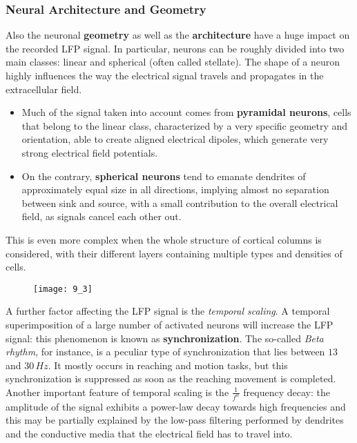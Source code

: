 \subsubsection{Neural Architecture and Geometry}
Also the neuronal \textbf{geometry} as well as the \textbf{architecture} have a huge
impact on the recorded LFP signal. In particular, neurons can be roughly divided into
two main classes: linear and spherical (often called stellate). The shape of a neuron
highly influences the way the electrical signal travels and propagates in the
extracellular field.
\begin{itemize}
    \item Much of the signal taken into account comes from \textbf{pyramidal neurons},
          cells that belong to the linear class, characterized by a very specific
          geometry and orientation, able to create aligned electrical dipoles, which
          generate very strong electrical field potentials.
    \item On the contrary, \textbf{spherical neurons} tend to emanate dendrites of
          approximately equal size in all directions, implying almost no separation
          between sink and source, with a small contribution to the overall electrical
          field, as signals cancel each other out.
\end{itemize}
This is even more complex when the whole structure of cortical columns is considered,
with their different layers containing multiple types and densities of cells.
\begin{figure}[H]
    \texttt{[image: 9\_3]}
    \centering
\end{figure}
A further factor affecting the LFP signal is the \textit{temporal scaling}. A temporal
superimposition of a large number of activated neurons will increase the LFP signal:
this phenomenon is known as \textbf{synchronization}. The so-called \textit{Beta rhythm},
for instance, is a peculiar type of synchronization that lies between \(13\) and
\(30\,Hz\). It mostly occurs in reaching and motion tasks, but this synchronization
is suppressed as soon as the reaching movement is completed. Another important feature
of temporal scaling is the \(\frac{1}{f^{\alpha}}\) frequency decay: the amplitude of
the signal exhibits a power-law decay towards high frequencies and this may be
partially explained by the low-pass filtering performed by dendrites and the
conductive media that the electrical field has to travel into.


